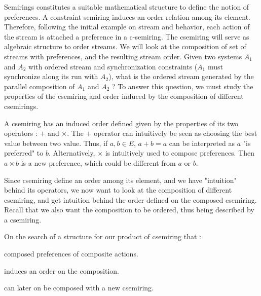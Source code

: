 Semirings constitutes a suitable mathematical structure to define the notion of preferences. A constraint semiring \cite{B04} induces an order relation among its element. Therefore, following the initial example on stream and behavior, each action of the stream is attached a preference in a c-semiring. The csemiring will serve as algebraic structure to order streams. We will look at the composition of set of streams with preferences, and the resulting stream order. 
Given two systems $A_1$ and $A_2$ with ordered stream and synchronization constraints ($A_1$ must synchronize along its run with $A_2$), what is the ordered stream generated by the parallel composition of $A_1$ and $A_2$ ? To answer this question, we must study the properties of the csemiring and order induced by the composition of different csemirings. 

A csemiring has an induced order defined given by the properties of its two operators : $+$ and $\times$. The $+$ operator can intuitively be seen as choosing the best value between two value. Thus, if $a,b \in E$, $a+b=a$ can be interpreted as $a$ "is preferred" to $b$. Alternatively, $\times$ is intuitively used to compose preferences. Then $a \times b$ is a new preference, which could be different from $a$ or $b$.

Since csemiring define an order among its element, and we have "intuition" behind its operators, we now want to look at the composition of different csemiring, and get intuition behind the order defined on the composed csemiring. Recall that we also want the composition to be ordered, thus being described by a csemiring.

On the search of a structure for our product of csemiring that :
\begin{list}{-}{}
	\item composed preferences of composite actions.
	\item induces an order on the composition.
	\item can later on be composed with a new csemiring.
\end{list}

